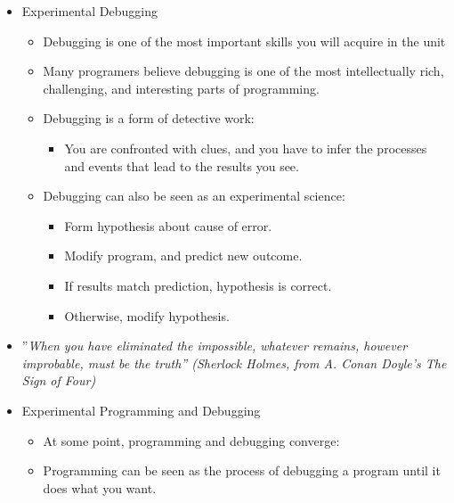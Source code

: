 \documentclass{beamer}
\begin{document}
\begin{frame}
\begin{itemize}
\item Experimental Debugging
\begin{itemize}
\item Debugging is one of the most important skills you will acquire in the unit 
\item Many programers believe debugging is one of the most intellectually rich, challenging, and interesting parts of programming. 
\item Debugging is a form of detective work: 
\begin{itemize}
\item You are confronted with clues, and you have to infer the processes and events that lead to the results you see.
\end{itemize}
\end{itemize}
\begin{itemize}
\item Debugging can also be seen as an experimental science: 
\begin{itemize}
\item Form hypothesis about cause of error. 
\item Modify program, and predict new outcome. 
\item If results match prediction, hypothesis is correct. 
\item Otherwise, modify hypothesis. 
\end{itemize}
\end{itemize}
\end{itemize}
\end{frame}

\begin{frame}
\begin{itemize}
\item {}''\textit{When you have eliminated the impossible, whatever remains, however improbable, must be the truth'' (Sherlock Holmes, from A. Conan Doyle's The Sign of Four) }
\end{itemize}
\end{frame}

\begin{frame}
\begin{itemize}
\item Experimental Programming  and Debugging 
\begin{itemize}
\item At some point, programming and debugging converge: 
\item Programming can be seen as the process of debugging a program until it does what you want. 
\end{itemize}
\end{itemize}
\end{frame}
\end{document}
